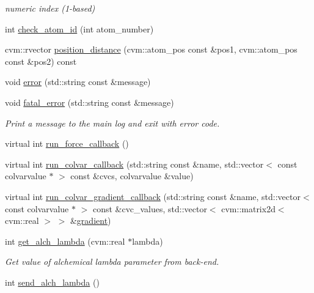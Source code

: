 \begin{DoxyCompactItemize}
\begin{DoxyCompactList}\small\item\em numeric index (1-\/based) \end{DoxyCompactList}\item 
int \hyperlink{classcolvarproxy__tinkerhp_a874d7f30175aef8986cac6cbecb34156}{check\-\_\-atom\-\_\-id} (int atom\-\_\-number)
\item 
cvm\-::rvector \hyperlink{classcolvarproxy__tinkerhp_a0f151e4bdc0dd039ef1e6c700ebab212}{position\-\_\-distance} (cvm\-::atom\-\_\-pos const \&pos1, cvm\-::atom\-\_\-pos const \&pos2) const 
\item 
void \hyperlink{classcolvarproxy__tinkerhp_a1a60dbdb7a558bf9dda77facc7f34bd0}{error} (std\-::string const \&message)
\item 
void \hyperlink{classcolvarproxy__tinkerhp_a18099807345d593ce923503d8317dc1c}{fatal\-\_\-error} (std\-::string const \&message)
\begin{DoxyCompactList}\small\item\em Print a message to the main log and exit with error code. \end{DoxyCompactList}\item 
virtual int \hyperlink{classcolvarproxy__tinkerhp_adee00c6273b7f5335663ca88fac5c7dc}{run\-\_\-force\-\_\-callback} ()
\item 
virtual int \hyperlink{classcolvarproxy__tinkerhp_a60607b6aacf91cc9d7157c3f07520fc0}{run\-\_\-colvar\-\_\-callback} (std\-::string const \&name, std\-::vector$<$ const colvarvalue $\ast$ $>$ const \&cvcs, colvarvalue \&value)
\item 
virtual int \hyperlink{classcolvarproxy__tinkerhp_aad55d13f4d72d49591aedd03595e61e8}{run\-\_\-colvar\-\_\-gradient\-\_\-callback} (std\-::string const \&name, std\-::vector$<$ const colvarvalue $\ast$ $>$ const \&cvc\-\_\-values, std\-::vector$<$ cvm\-::matrix2d$<$ cvm\-::real $>$ $>$ \&\hyperlink{gradient_8f90_a8665411aa7f5050b7002b6723044274d}{gradient})
\item 
int \hyperlink{classcolvarproxy__tinkerhp_a7a63f714db1a75fb4dd9368ca90d2c47}{get\-\_\-alch\-\_\-lambda} (cvm\-::real $\ast$lambda)
\begin{DoxyCompactList}\small\item\em Get value of alchemical lambda parameter from back-\/end. \end{DoxyCompactList}\item 
int \hyperlink{classcolvarproxy__tinkerhp_a179fb699574b714e4786fa6b8cedefa5}{send\-\_\-alch\-\_\-lambda} ()

\end{DoxyCompactItemize}
